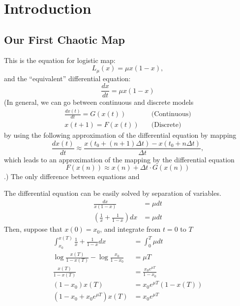 \documentclass[11pt]{book}
\begin{document}
\chapter{Introduction}
\section{Our First Chaotic Map}
This is the equation for logistic map:
\begin{equation}
  L_{\mu}(x) = \mu x(1-x),
  \label{logistic}
\end{equation}
and the ``equivalent'' differential equation:
\begin{equation}
  \frac{dx}{dt} = \mu x(1-x)
  \label{logisticdiffeq}
\end{equation}
(In general, we can go between continuous and discrete models
\begin{align*}
  \frac{dx(t)}{dt} = G(x(t)) &\quad\mbox{(Continuous)} \\
  x(t + 1) = F(x(t)) &\quad\mbox{(Discrete)}
\end{align*}
by using the following approximation of the differential equation by mapping
\begin{equation*}
  \frac{dx(t)}{dt} \approx \frac{x(t_0 + (n+1)\Delta t) - x(t_0 + n \Delta t)}{\Delta t},
\end{equation*}
which leads to an approximation of the mapping by the differential equation
\begin{equation*}
  F(x(n)) \approx x(n) + \Delta t \cdot G(x(n))
\end{equation*}
.)
The only difference between equations  and 

The differential equation  can be easily solved by separation of variables.
\begin{align*}
  \frac{dx}{x(1-x)} &= \mu dt \\  
  \left( \frac{1}{x} + \frac{1}{1-x} \right) dx &= \mu dt
\end{align*}
Then, suppose that $x(0) = x_0$, and integrate from $t = 0$ to $T$
\begin{align*}
  \int_{x_0}^{x(T)} \frac{1}{x} + \frac{1}{1-x} dx &= \int_0^T \mu dt \\
  \log{\frac{x(T)}{1-x(T)}} - \log{\frac{x_0}{1-x_0}} &= \mu T \\
  \frac{x(T)}{1-x(T)} &= \frac{x_0 e^{\mu T}}{1-x_0} \\
  (1-x_0)x(T) &= x_0 e^{\mu T} (1-x(T)) \\
  (1-x_0 + x_0 e^{\mu T})x(T) &= x_0 e^{\mu T}
\end{align*}
\end{document}
